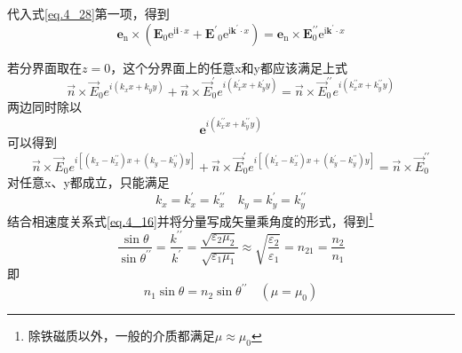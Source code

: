         代入式\ref{eq.4_28}第一项，得到
        \begin{equation*}
            \boldsymbol{e}_{\mathrm{n}} \times\left(\boldsymbol{E}_{0} \mathrm{e}^{\mathrm{i} \boldsymbol{i} \cdot x}+\boldsymbol{E}^{\prime}{ }_{0} \mathrm{e}^{\mathrm{i} \mathbf{k}^{\prime} \cdot x}\right)=\boldsymbol{e}_{\mathrm{n}} \times \boldsymbol{E}_{0}^{\prime \prime} \mathrm{e}^{\mathrm{i} \boldsymbol{k}^{\prime} \cdot x}
        \end{equation*}

        若分界面取在$z=0$，这个分界面上的任意x和y都应该满足上式
        \begin{equation*}
            \vec{n} \times \vec{E}_{0} e^{i\left(k_{x} x+k_{y} y\right)}+\vec{n} \times \vec{E}_{0}^{\prime} e^{i\left(k_{x}^{\prime} x+k_{y}^{\prime} y\right)}=\vec{n} \times \vec{E}_{0}^{\prime \prime} e^{i\left(k_{x}^{\prime \prime} x+k_{y}^{\prime \prime} y\right)}
        \end{equation*}
        两边同时除以\[\boldsymbol{e}^{i{(k_x^{\prime \prime}x+k_y^{\prime \prime}y)}}\]可以得到
        \begin{equation*}
            \vec{n} \times \vec{E}_{0} e^{i\left[\left(k_{x}-k_{x}^{\prime \prime}\right) x+\left(k_{y}-k_{y}^{\prime\prime}\right) y\right]}+\vec{n} \times \vec{E}_{0}^{\prime} e^{i\left[\left(k_{x}^{\prime}-k_{x}^{\prime\prime}\right) x+\left(k_{y}^{\prime}-k_{y}^{\prime\prime}\right) y\right]}=\vec{n} \times \vec{E}_{0}^{\prime \prime}
        \end{equation*}
        对任意x、y都成立，只能满足\[k_{x}=k_{x}^{\prime}=k_{x}^{\prime \prime} \quad k_{y}=k_{y}^{\prime}=k_{y}^{\prime \prime}\]结合相速度关系式\ref{eq.4_16}并将分量写成矢量乘角度的形式，得到\footnote{除铁磁质以外，一般的介质都满足$\mu \approx \mu_0$}
        \begin{equation}
            \frac{\sin \theta}{\sin \theta^{\prime \prime}}=\frac{k^{\prime \prime}}{k^{\prime}}=\frac{\sqrt{\varepsilon_{2} \mu_{2}}}{\sqrt{\varepsilon_{1} \mu_{1}}} \approx \sqrt{\frac{\varepsilon_{2}}{\varepsilon_{1}}}=n_{21}=\frac{n_{2}}{n_{1}}
        \end{equation}
        即
        \begin{equation}
            \boxed{n_{1} \sin \theta=n_{2} \sin \theta^{\prime \prime} \quad\left(\mu=\mu_{0}\right)}
        \end{equation}
